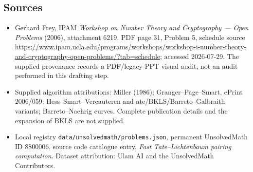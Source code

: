 \documentclass[11pt]{article}
\begin{document}
\subsection{Sources}
\begin{itemize}
\item Gerhard Frey, IPAM \emph{Workshop on Number Theory and Cryptography --- Open Problems} (2006), attachment 6219, PDF page 31, Problem 5, schedule source \url{https://www.ipam.ucla.edu/programs/workshops/workshop-i-number-theory-and-cryptography-open-problems/?tab=schedule}; accessed 2026-07-29. The supplied provenance records a PDF/legacy-PPT visual audit, not an audit performed in this drafting step.
\item Supplied algorithm attributions: Miller (1986); Granger--Page--Smart, ePrint 2006/059; Hess--Smart--Vercauteren and ate/BKLS/Barreto--Galbraith variants; Barreto--Naehrig curves. Complete publication details and the expansion of BKLS are not supplied.
\item Local registry \texttt{data/unsolvedmath/problems.json}, permanent UnsolvedMath ID $8800006$, source code catalogue entry, \emph{Fast Tate--Lichtenbaum pairing computation}. Dataset attribution: Ulam AI and the UnsolvedMath Contributors.
\end{itemize}
\end{document}
